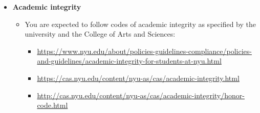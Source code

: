 \documentclass[11pt]{article}
\begin{document}
\begin{itemize}
	\item \textbf{Academic integrity}
	\begin{itemize}
		\item You are expected to follow codes of academic integrity as specified by the university and the College of Arts and Sciences:
		\begin{itemize}
			\item \url{https://www.nyu.edu/about/policies-guidelines-compliance/policies-and-guidelines/academic-integrity-for-students-at-nyu.html}
			\item \url{https://cas.nyu.edu/content/nyu-as/cas/academic-integrity.html}
			\item \url{http://cas.nyu.edu/content/nyu-as/cas/academic-integrity/honor-code.html}
		\end{itemize}
	\end{itemize}
\end{itemize}
\end{document}
